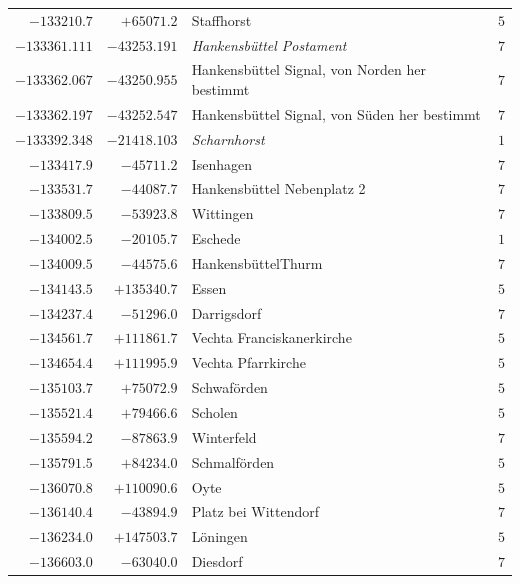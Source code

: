 \begin{center}
\begin{tabular}{r|r|p{170pt}|r}
\(-133210.7\)&\(+65071.2\)&Staffhorst&\(5\)\\
\(-133361.111\)&\(-43253.191\)&\textit{Hankensbüttel Postament}&\(7\)\\
\(-133362.067\)&\(-43250.955\)&Hankensbüttel Signal, von Norden her bestimmt&\(7\)\\
\(-133362.197\)&\(-43252.547\)&Hankensbüttel Signal, von Süden her bestimmt&\(7\)\\
\(-133392.348\)&\(-21418.103\)&\textit{Scharnhorst}&\(1\)\\
\(-133417.9\)&\(-45711.2\)&Isenhagen&\(7\)\\
\(-133531.7\)&\(-44087.7\)&Hankensbüttel Nebenplatz 2&\(7\)\\
\(-133809.5\)&\(-53923.8\)&Wittingen&\(7\)\\
\(-134002.5\)&\(-20105.7\)&Eschede&\(1\)\\
\(-134009.5\)&\(-44575.6\)&HankensbüttelThurm&\(7\)\\
\(-134143.5\)&\(+135340.7\)&Essen&\(5\)\\
\(-134237.4\)&\(-51296.0\)&Darrigsdorf&\(7\)\\
\(-134561.7\)&\(+111861.7\)&Vechta Franciskanerkirche&\(5\)\\
\(-134654.4\)&\(+111995.9\)&Vechta Pfarrkirche&\(5\)\\
\(-135103.7\)&\(+75072.9\)&Schwaförden&\(5\)\\
\(-135521.4\)&\(+79466.6\)&Scholen&\(5\)\\
\(-135594.2\)&\(-87863.9\)&Winterfeld&\(7\)\\
\(-135791.5\)&\(+84234.0\)&Schmalförden&\(5\)\\
\(-136070.8\)&\(+110090.6\)&Oyte&\(5\)\\
\(-136140.4\)&\(-43894.9\)&Platz bei Wittendorf&\(7\)\\
\(-136234.0\)&\(+147503.7\)&Löningen&\(5\)\\
\(-136603.0\)&\(-63040.0\)&Diesdorf&\(7\)\\
\hline\end{tabular}\endgroup\end{center}
\clearpage
